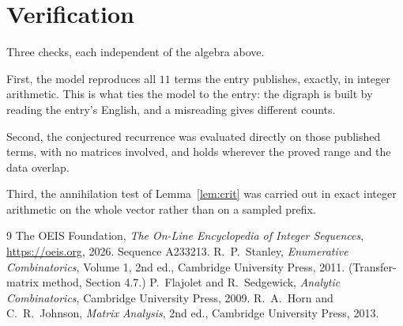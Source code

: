 \documentclass[11pt,a4paper]{article}
\theoremstyle{plain}
\theoremstyle{definition}
\begin{document}
\section{Verification}

Three checks, each independent of the algebra above.

First, the model reproduces all $11$ terms the entry publishes, exactly, in integer
arithmetic. This is what ties the model to the entry: the digraph is built by reading the
entry's English, and a misreading gives different counts.

Second, the conjectured recurrence was evaluated directly on those published terms, with no
matrices involved, and holds wherever the proved range and the data overlap.

Third, the annihilation test of Lemma~\ref{lem:crit} was carried out in exact integer
arithmetic on the whole vector rather than on a sampled prefix.

\begin{thebibliography}{9}
 The OEIS Foundation, \emph{The On-Line Encyclopedia of Integer
Sequences}, \url{https://oeis.org}, 2026. Sequence A233213.
 R.~P.~Stanley, \emph{Enumerative Combinatorics}, Volume 1, 2nd ed.,
Cambridge University Press, 2011. (Transfer-matrix method, Section 4.7.)
 P.~Flajolet and R.~Sedgewick, \emph{Analytic Combinatorics}, Cambridge
University Press, 2009.
 R.~A.~Horn and C.~R.~Johnson, \emph{Matrix Analysis}, 2nd ed., Cambridge
University Press, 2013.
\end{thebibliography}
\end{document}

